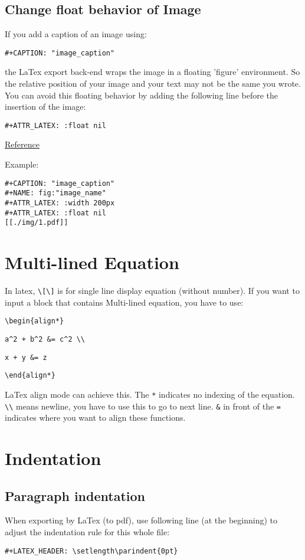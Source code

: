 \documentclass[12pt]{book}
\begin{document}
\section{Change float behavior of Image}
\label{sec:org1e0ee38}
If you add a caption of an image using:
\begin{verbatim}
#+CAPTION: "image_caption"
\end{verbatim}
the LaTex export back-end wraps the image in a floating 'figure' environment. So the relative position of your image and your text may not be the same you wrote. You can avoid this floating behavior by adding the following line before the insertion of the image:
\begin{verbatim}
#+ATTR_LATEX: :float nil
\end{verbatim}

\href{https://orgmode.org/manual/Images-in-LaTeX-export.html}{Reference}

Example:
\begin{verbatim}
#+CAPTION: "image_caption"
#+NAME: fig:"image_name"
#+ATTR_LATEX: :width 200px
#+ATTR_LATEX: :float nil
[[./img/1.pdf]]
\end{verbatim}

\chapter{Multi-lined Equation}
\label{sec:org06bf409}
In latex, \texttt{\textbackslash{}[\textbackslash{}]} is for single line display equation (without number). If you want to input a block that contains Multi-lined equation, you have to use:

\texttt{\textbackslash{}begin\{align*\}}

\texttt{a\textasciicircum{}2 + b\textasciicircum{}2 \&= c\textasciicircum{}2 \textbackslash{}\textbackslash{}}

\texttt{x + y \&= z}

\texttt{\textbackslash{}end\{align*\}}

LaTex align mode can achieve this. The \texttt{*} indicates no indexing of the equation. \texttt{\textbackslash{}\textbackslash{}} means newline, you have to use this to go to next line. \texttt{\&} in front of the \texttt{=} indicates where you want to align these functions.

\chapter{Indentation}
\label{sec:orgdd4a37b}
\section{Paragraph indentation}
\label{sec:org662aad3}
When exporting by LaTex (to pdf), use following line (at the beginning) to adjust the indentation rule for this whole file:
\begin{verbatim}
#+LATEX_HEADER: \setlength\parindent{0pt}
\end{verbatim}
\end{document}
